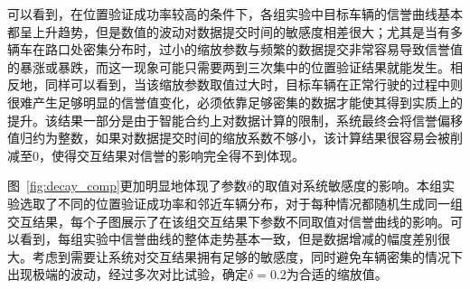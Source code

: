 可以看到，在位置验证成功率较高的条件下，各组实验中目标车辆的信誉曲线基本都呈上升趋势，但是数值的波动对数据提交时间的敏感度相差很大；尤其是当有多辆车在路口处密集分布时，过小的缩放参数与频繁的数据提交非常容易导致信誉值的暴涨或暴跌，而这一现象可能只需要两到三次集中的位置验证结果就能发生。相反地，同样可以看到，当该缩放参数取值过大时，目标车辆在正常行驶的过程中则很难产生足够明显的信誉值变化，必须依靠足够密集的数据才能使其得到实质上的提升。该结果一部分是由于智能合约上对数据计算的限制，系统最终会将信誉偏移值归约为整数，如果对数据提交时间的缩放系数不够小，该计算结果很容易会被削减至0，使得交互结果对信誉的影响完全得不到体现。

图~\ref{fig:decay_comp}更加明显地体现了参数$\delta$的取值对系统敏感度的影响。本组实验选取了不同的位置验证成功率和邻近车辆分布，对于每种情况都随机生成同一组交互结果，每个子图展示了在该组交互结果下参数不同取值对信誉曲线的影响。可以看到，每组实验中信誉曲线的整体走势基本一致，但是数据增减的幅度差别很大。考虑到需要让系统对交互结果拥有足够的敏感度，同时避免车辆密集的情况下出现极端的波动，经过多次对比试验，确定$\delta=0.2$为合适的缩放值。

